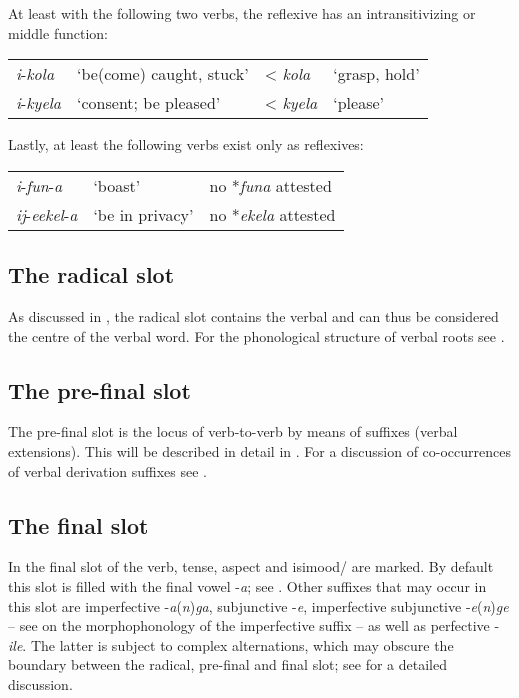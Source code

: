 At least with the following two verbs, the reflexive has an intransitivizing or middle function:
\begin{exe}
	\ex
	\begin{tabular}[t]{llll}
		\textit{i}-\textit{kola} & \lq be(come) caught, stuck' & < \textit{kola} & \lq grasp, hold'\\
		\textit{i}-\textit{kyela} & \lq consent; be pleased' & < \textit{kyela} & \lq please'
	\end{tabular}
\end{exe}

Lastly, at least the following verbs exist only as reflexives:
\begin{exe}
	\ex
	\begin{tabular}[t]{lll}
		\textit{i}-\textit{fun}-\textit{a} & \lq boast'& no *\textit{funa} attested\\
		\textit{ij}-\textit{eekel}-\textit{a} & \lq be in privacy' & no *\textit{ekela} attested
	\end{tabular}
\end{exe}
 

\subsection{The radical slot}
As discussed in , the radical slot contains the verbal  and can thus be considered the centre of the verbal word. For the phonological structure of verbal roots see .

\subsection{The pre-final slot}
The pre-final slot is the locus of verb-to-verb  by means of suffixes (verbal extensions). This will be described in detail in . For a discussion of co-occurrences of verbal derivation suffixes see .

\subsection{The final slot}\label{FinalSlot}
In the final slot of the verb, tense, aspect and isi{mood}/ are marked. By default this slot is filled with the final vowel -\textit{a}; see . Other suffixes that may occur in this slot are imperfective -\textit{a}(\textit{n})\textit{ga}, subjunctive -\textit{e}, imperfective subjunctive -\textit{e}(\textit{n})\textit{ge} -- see  on the morphophonology of the imperfective suffix -- as well as perfective -\textit{ile}. The latter is subject to complex alternations, which may obscure the boundary between the radical, pre-final and final slot; see  for a detailed discussion.

